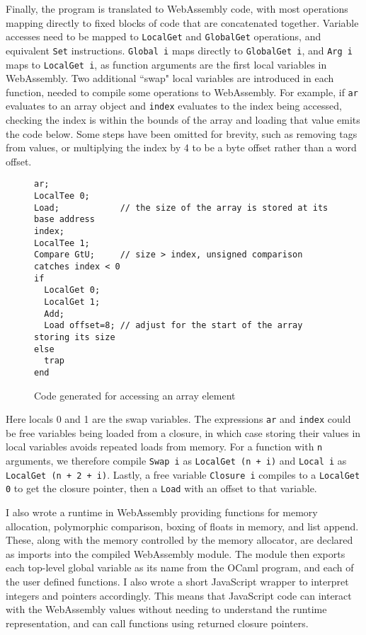 Finally, the program is translated to WebAssembly code, with most operations mapping directly to fixed blocks of code that are concatenated together. Variable accesses need to be mapped to \verb|LocalGet| and \verb|GlobalGet| operations, and equivalent \verb|Set| instructions. \verb|Global i| maps directly to \verb|GlobalGet i|, and \verb|Arg i| maps to \verb|LocalGet i|, as function arguments are the first local variables in WebAssembly. Two additional ``swap" local variables are introduced in each function, needed to compile some operations to WebAssembly. 
For example, if \verb|ar| evaluates to an array object and \verb|index| evaluates to the index being accessed, checking the index is within the bounds of the array and loading that value emits the code below. Some steps have been omitted for brevity, such as removing tags from values, or multiplying the index by 4 to be a byte offset rather than a word offset.

\begin{figure}[H]
\begin{verbatim}
ar; 
LocalTee 0;
Load;            // the size of the array is stored at its base address
index; 
LocalTee 1; 
Compare GtU;     // size > index, unsigned comparison catches index < 0
if
  LocalGet 0;
  LocalGet 1;
  Add;
  Load offset=8; // adjust for the start of the array storing its size
else
  trap 
end
\end{verbatim}
\caption{Code generated for accessing an array element}
\end{figure}

Here locals 0 and 1 are the swap variables. The expressions \verb|ar| and \verb|index| could be free variables being loaded from a closure, in which case storing their values in local variables avoids repeated loads from memory. 
 For a function with \verb|n| arguments, we therefore compile \verb|Swap i| as \verb|LocalGet (n + i)| and \verb|Local i| as \verb|LocalGet (n + 2 + i)|. Lastly,  a free variable \verb|Closure i| compiles to a \verb|LocalGet 0| to get the closure pointer, then a \verb|Load| with an offset to that variable.



I also wrote a runtime in WebAssembly providing functions for memory allocation, polymorphic comparison, boxing of floats in memory, and list append. These, along with the memory controlled by the memory allocator, are declared as imports into the compiled WebAssembly module. The module then exports each top-level global variable as its name from the OCaml program, and each of the user defined functions. 
I also wrote a short JavaScript wrapper to interpret integers and pointers accordingly. This means that JavaScript code can interact with the WebAssembly values without needing to understand the runtime representation, and can call functions using returned closure pointers.

